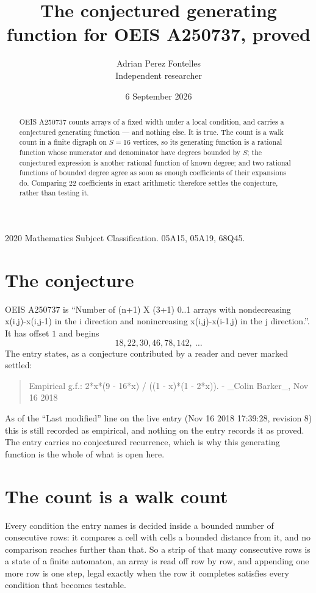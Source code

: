 \documentclass[11pt,a4paper]{article}
\title{The conjectured generating function for OEIS A250737, proved}
\author{Adrian Perez Fontelles\\ \small Independent researcher}
\date{6 September 2026}
\theoremstyle{plain}
\theoremstyle{definition}
\begin{document}
\maketitle

\begin{abstract}
OEIS A250737 counts arrays of a fixed width under a local condition, and carries a conjectured
generating function --- and nothing else. It is true. The count is a walk count in a finite
digraph on $S=16$ vertices, so its generating function is a rational function whose numerator
and denominator have degrees bounded by $S$; the conjectured expression is another rational
function of known degree; and two rational functions of bounded degree agree as soon as enough
coefficients of their expansions do. Comparing $22$ coefficients in exact arithmetic
therefore settles the conjecture, rather than testing it.
\end{abstract}

\noindent\small 2020 Mathematics Subject Classification. 05A15, 05A19, 68Q45.\normalsize

\section{The conjecture}

OEIS A250737 is ``Number of (n+1) X (3+1) 0..1 arrays with nondecreasing x(i,j)-x(i,j-1) in the i direction and nonincreasing x(i,j)-x(i-1,j) in the j direction.''. It has offset $1$ and begins
\[
18, 22, 30, 46, 78, 142,\ \dots
\]
The entry states, as a conjecture contributed by a reader and never marked settled:
\begin{quote}
Empirical g.f.: 2*x*(9 - 16*x) / ((1 - x)*(1 - 2*x)). - \_Colin Barker\_, Nov 16 2018
\end{quote}
As of the ``Last modified'' line on the live entry (Nov 16 2018 17:39:28, revision 8) this is still
recorded as empirical, and nothing on the entry records it as proved. The entry carries no
conjectured recurrence, which is why this generating function is the whole of what is open
here.

\section{The count is a walk count}

Every condition the entry names is decided inside a bounded number of consecutive rows: it
compares a cell with cells a bounded distance from it, and no comparison reaches further than
that. So a strip of that many consecutive rows is a state of a finite automaton, an array is
read off row by row, and appending one more row is one step, legal exactly when the row it
completes satisfies every condition that becomes testable.
\end{document}
